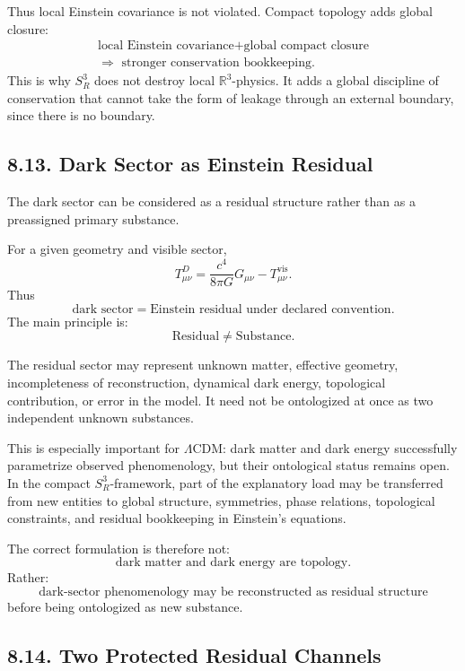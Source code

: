 \documentclass[12pt,a4paper]{article}
\theoremstyle{definition}
\begin{document}
Thus local Einstein covariance is not violated. Compact topology adds global closure:
\begin{multline*}
\text{local Einstein covariance}
+
\text{global compact closure}\\
\Rightarrow
\text{ stronger conservation bookkeeping}.
\end{multline*}
This is why \(S^3_R\) does not destroy local \(\mathbb R^3\)-physics. It adds a global discipline of conservation that cannot take the form of leakage through an external boundary, since there is no boundary.

\subsection*{8.13. Dark Sector as Einstein Residual}

The dark sector can be considered as a residual structure rather than as a preassigned primary substance.

For a given geometry and visible sector,
\[
T^D_{\mu\nu}
=
\frac{c^4}{8\pi G}G_{\mu\nu}
-
T^{\mathrm{vis}}_{\mu\nu}.
\]
Thus
\[
\text{dark sector}
=
\text{Einstein residual under declared convention}.
\]
The main principle is:
\[
\mathrm{Residual}\neq \mathrm{Substance}.
\]

The residual sector may represent unknown matter, effective geometry, incompleteness of reconstruction, dynamical dark energy, topological contribution, or error in the model. It need not be ontologized at once as two independent unknown substances.

This is especially important for \(\Lambda\)CDM: dark matter and dark energy successfully parametrize observed phenomenology, but their ontological status remains open. In the compact \(S^3_R\)-framework, part of the explanatory load may be transferred from new entities to global structure, symmetries, phase relations, topological constraints, and residual bookkeeping in Einstein's equations.

The correct formulation is therefore not:
\[
\text{dark matter and dark energy are topology}.
\]
Rather:
\[
\text{dark-sector phenomenology may be reconstructed as residual structure}
\]
before being ontologized as new substance.

\subsection*{8.14. Two Protected Residual Channels}
\end{document}
